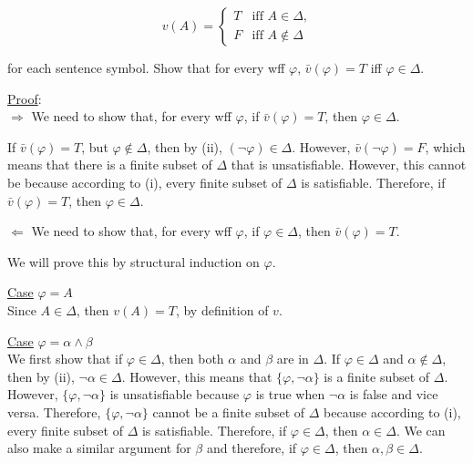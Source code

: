 \documentclass[12pt]{article}	%
\begin{document}
\begin{flushleft}
$$
v(A) = 
\begin{cases}
T & \text{iff $A \in \Delta$,}\\
F & \text{iff $A \notin \Delta$}
\end{cases}
$$

for each sentence symbol. Show that for every wff $\varphi$, $\bar{v}(\varphi) = T$ iff $\varphi \in \Delta$. \\

\vspace{5mm}

\underline{Proof}: \\
$\Rightarrow$ We need to show that, for every wff $\varphi$, if $\bar{v}(\varphi) = T$, then $\varphi \in \Delta$. \\

\vspace{2mm}

If $\bar{v}(\varphi) = T$, but $\varphi \notin \Delta$, then by (ii), $(\neg\varphi) \in \Delta$. However, $\bar{v}(\neg\varphi) = F$, which means that there is a finite subset of $\Delta$ that is unsatisfiable. However, this cannot be because according to (i), every finite subset of $\Delta$ is satisfiable. Therefore, if $\bar{v}(\varphi) = T$, then $\varphi \in \Delta$. \\

\vspace{5mm}

$\Leftarrow$ We need to show that, for every wff $\varphi$, if $\varphi \in \Delta$, then $\bar{v}(\varphi) = T$. \\

\vspace{2mm}

We will prove this by structural induction on $\varphi$. \\

\vspace{2mm}

\underline{Case} $\varphi = A$ \\
Since $A \in \Delta$, then $v(A) = T$, by definition of $v$. \\

\vspace{2mm}

\underline{Case} $\varphi = \alpha \wedge \beta$ \\
We first show that if $\varphi \in \Delta$, then both $\alpha$ and $\beta$ are in $\Delta$. If $\varphi \in \Delta$ and $\alpha \notin \Delta$, then by (ii), $\neg\alpha \in \Delta$. However, this means that $\{\varphi,\neg\alpha\}$ is a finite subset of $\Delta$. However, $\{\varphi,\neg\alpha\}$ is unsatisfiable because $\varphi$ is true when $\neg\alpha$ is false and vice versa. Therefore, $\{\varphi,\neg\alpha\}$ cannot be a finite subset of $\Delta$ because according to (i), every finite subset of $\Delta$ is satisfiable. Therefore, if $\varphi \in \Delta$, then $\alpha \in \Delta$. We can also make a similar argument for $\beta$ and therefore, if $\varphi \in \Delta$, then $\alpha,\beta \in \Delta$.


\end{flushleft}
\end{document}
